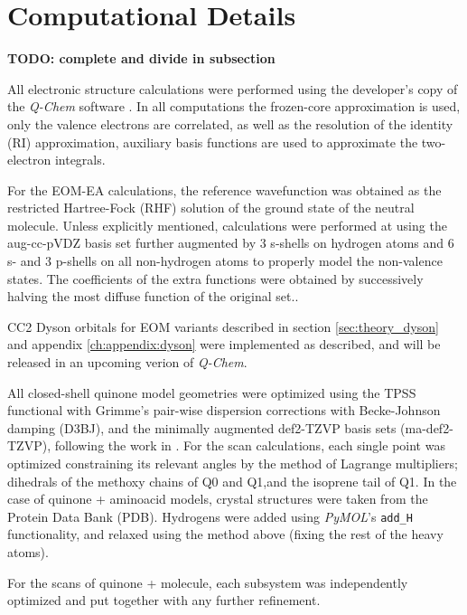 \chapter{Computational Details}\label{ch:methods}

\textbf{TODO: complete and divide in subsection}

All electronic structure calculations were performed using the developer's copy of the \textit{Q-Chem} software \cite{QChem5}. In all computations the frozen-core
approximation is used, only the valence electrons are correlated, as well as the resolution of the identity (RI) approximation, auxiliary basis functions are used to approximate the two-electron integrals\cite{hattig2000cc2}.

For the EOM-EA calculations, the reference wavefunction was obtained as the restricted Hartree-Fock (RHF) solution of the ground state of the neutral molecule. Unless explicitly mentioned, calculations were performed at using the aug-cc-pVDZ basis set \cite{dunning1989gaussian} further augmented by 3 s-shells on hydrogen atoms and 6 s- and 3 p-shells on all non-hydrogen atoms \cite{paran2024performance} to properly model the non-valence states. The coefficients of the extra functions were obtained by successively halving the most diffuse function of the original set.\label{sec:methods:basis}.

CC2 Dyson orbitals for EOM variants described in section \ref{sec:theory_dyson} and appendix \ref{ch:appendix:dyson} were implemented as described, and will be released in an upcoming verion of \textit{Q-Chem}.

All closed-shell quinone model geometries were optimized using the TPSS functional\cite{tao2003climbing} with Grimme's pair-wise dispersion corrections with Becke-Johnson damping (D3BJ)\cite{grimme2011effect}, and the minimally augmented\cite{zheng2011minimally} def2-TZVP basis sets\cite{weigend2005balanced} (ma-def2-TZVP), following the work in \cite{schulz2018systematic}. For the scan calculations, each single point was optimized constraining its relevant angles by the method of Lagrange multipliers; dihedrals of the methoxy chains of Q0 and Q1,and the isoprene tail of Q1.
In the case of quinone + aminoacid models, crystal structures were taken from the Protein Data Bank (PDB). Hydrogens were added using \textit{PyMOL}'s \cite{PyMOL} \texttt{add\_H}  functionality, and relaxed using the method above (fixing the rest of the heavy atoms).

For the scans of quinone + molecule, each subsystem was independently optimized and put together with any further refinement.

